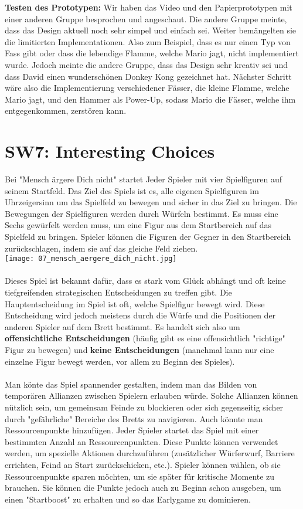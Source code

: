 \documentclass{article}
\begin{document}
\bigskip
\textbf{Testen des Prototypen:}
Wir haben das Video und den Papierprototypen mit einer anderen Gruppe besprochen und angeschaut. Die andere Gruppe meinte, dass das
Design aktuell noch sehr simpel und einfach sei. Weiter bemängelten sie die limitierten Implementationen. Also zum Beispiel,
dass es nur einen Typ von Fass gibt oder dass die lebendige Flamme, welche Mario jagt, nicht implementiert wurde. Jedoch meinte die
andere Gruppe, dass das Design sehr kreativ sei und dass David einen wunderschönen Donkey Kong gezeichnet hat.
Nächster Schritt wäre also die Implementierung verschiedener Fässer, die kleine Flamme, welche Mario jagt, und den Hammer als
Power-Up, sodass Mario die Fässer, welche ihm entgegenkommen, zerstören kann.

\section{SW7: Interesting Choices}

Bei "Mensch ärgere Dich nicht" startet Jeder Spieler mit vier Spielfiguren auf seinem Startfeld. Das Ziel des Spiels ist es, alle
eigenen Spielfiguren im Uhrzeigersinn um das Spielfeld zu bewegen und sicher in das Ziel zu bringen. Die Bewegungen der Spielfiguren
werden durch Würfeln bestimmt. Es muss eine Sechs gewürfelt werden muss, um eine Figur aus dem Startbereich auf das Spielfeld zu
bringen. Spieler können die Figuren der Gegner in den Startbereich zurückschlagen, indem sie auf das gleiche Feld ziehen.
\\
\texttt{[image: 07\_mensch\_aergere\_dich\_nicht.jpg]}
\\ \\
Dieses Spiel ist bekannt dafür, dass es stark vom Glück abhängt und oft keine tiefgreifenden strategischen Entscheidungen zu treffen
gibt. Die Hauptentscheidung im Spiel ist oft, welche Spielfigur bewegt wird. Diese Entscheidung wird jedoch meistens durch die
Würfe und die Positionen der anderen Spieler auf dem Brett bestimmt. Es handelt sich also um \textbf{offensichtliche
Entscheidungen} (häufig gibt es eine offensichtlich "richtige" Figur zu bewegen) und \textbf{keine 
Entscheidungen} (manchmal kann nur eine einzelne Figur bewegt werden, vor allem zu Beginn des Spieles).
\\ \\
Man könte das Spiel spannender gestalten, indem man das Bilden von temporären Allianzen zwischen Spielern erlauben würde.
Solche Allianzen können nützlich sein, um gemeinsam Feinde zu blockieren oder sich gegenseitig sicher durch "gefährliche" Bereiche
des Bretts zu navigieren.
Auch könnte man Ressourcenpunkte hinzufügen. Jeder Spieler startet das Spiel mit einer bestimmten Anzahl an Ressourcenpunkten. Diese
Punkte können verwendet werden, um spezielle Aktionen durchzuführen (zusätzlicher Würferwurf, Barriere errichten, Feind an Start zurückschicken, etc.).
Spieler können wählen, ob sie Ressourcenpunkte sparen möchten, um sie später für kritische Momente zu brauchen. Sie können die
Punkte jedoch auch zu Beginn schon ausgeben, um einen "Startboost" zu erhalten und so das Earlygame zu dominieren.
\end{document}
